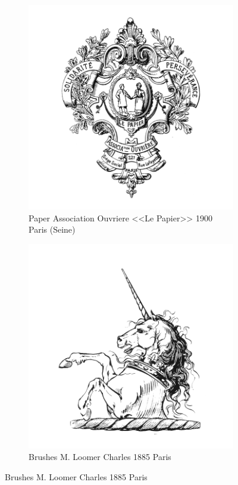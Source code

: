 \begin{figure}[h]
  \begin{subfigure}{.45\textwidth}
    \centering
    \includegraphics[width=.5\linewidth]{images/supplement/trademarks/french/3_11}
    \caption{Paper Association Ouvriere <<Le Papier>> 1900 Paris (Seine)}
    \label{fig:trademarks:french:3.11}
  \end{subfigure}\hfill
  \begin{subfigure}{.45\textwidth}
    \centering
    \includegraphics[width=.5\linewidth]{images/supplement/trademarks/french/4_1}
    \caption{Brushes M. Loomer Charles 1885 Paris}
    \label{fig:trademarks:french:4.1}
  \end{subfigure}


\end{figure}

